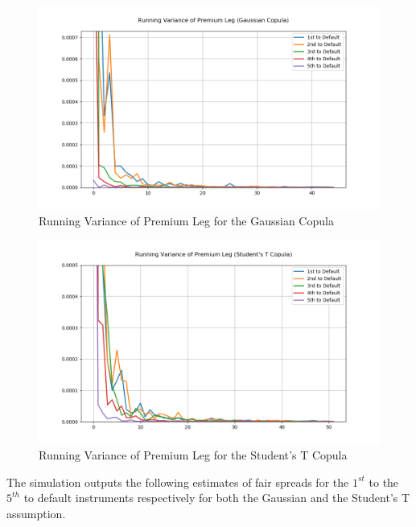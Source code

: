 \documentclass{report}
\theoremstyle{plain}
\theoremstyle{definition}
\begin{document}
\begin{figure}[H]
	\begin{center}
		\includegraphics[width=15cm]{Running_Variance_of_Premium_Leg_(Gaussian_Copula).png}
		\caption{Running Variance of Premium Leg for the Gaussian Copula} 
		\label{Running_Variance_of_Premium_Leg_(Gaussian_Copula)}
	\end{center}
\end{figure}

\begin{figure}[H]
	\begin{center}
		\includegraphics[width=15cm]{Running_Variance_of_Premium_Leg_(Student's_T_Copula).png}
		\caption{Running Variance of Premium Leg for the Student's T Copula} 
		\label{Running_Variance_of_Premium_Leg_(Student's_T_Copula)}
	\end{center}
\end{figure}


The simulation outputs the following estimates of fair spreads for the $1^{st}$ to the $5^{th}$ to default instruments respectively for both the Gaussian and the Student's T assumption.
\end{document}

